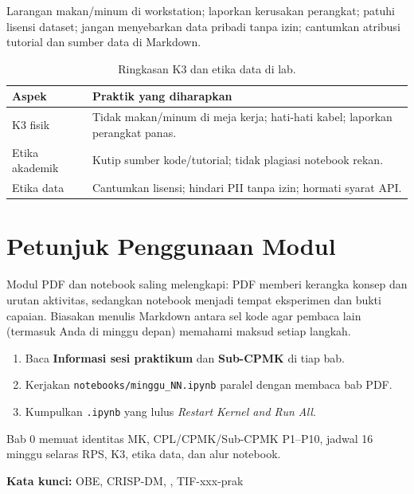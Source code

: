 \documentclass[../main.tex]{subfiles}
\begin{document}
Larangan makan/minum di workstation; laporkan kerusakan perangkat; patuhi lisensi dataset; jangan menyebarkan data pribadi tanpa izin; cantumkan atribusi tutorial dan sumber data di Markdown.

\begin{table}[htbp]
\centering
\caption{Ringkasan K3 dan etika data di lab.}
\label{tab:k3-etika}
\begin{tabular}{@{}p{3.5cm}p{9.2cm}@{}}
\toprule
\textbf{Aspek} & \textbf{Praktik yang diharapkan} \\
\midrule
K3 fisik & Tidak makan/minum di meja kerja; hati-hati kabel; laporkan perangkat panas. \\
Etika akademik & Kutip sumber kode/tutorial; tidak plagiasi notebook rekan. \\
Etika data & Cantumkan lisensi; hindari PII tanpa izin; hormati syarat API. \\
\bottomrule
\end{tabular}
\end{table}

\section{Petunjuk Penggunaan Modul}

Modul PDF dan notebook saling melengkapi: PDF memberi kerangka konsep dan urutan aktivitas, sedangkan notebook menjadi tempat eksperimen dan bukti capaian. Biasakan menulis Markdown antara sel kode agar pembaca lain (termasuk Anda di minggu depan) memahami maksud setiap langkah.

\begin{enumerate}[leftmargin=*]
  \item Baca \textbf{Informasi sesi praktikum} dan \textbf{Sub-CPMK} di tiap bab.
  \item Kerjakan \texttt{notebooks/minggu\_NN.ipynb} paralel dengan membaca bab PDF.
  \item Kumpulkan \texttt{.ipynb} yang lulus \textit{Restart Kernel and Run All}.
\end{enumerate}



\begin{rangkuman}
Bab 0 memuat identitas MK, CPL/CPMK/Sub-CPMK P1--P10, jadwal 16 minggu selaras RPS, K3, etika data, dan alur notebook.

\textbf{Kata kunci:} OBE, CRISP-DM, \jupyter{}, TIF-xxx-prak
\end{rangkuman}
\end{document}
